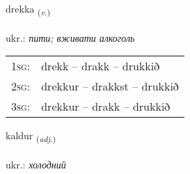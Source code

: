 \documentclass[frontgrid, backgrid]{flacards}\usepackage[]{graphicx}\usepackage[]{xcolor}
\begin{document}
\renewcommand{\blhead}{\vskip5pt {\small\bfseries\footnotesize Sagnorð | дієслово }}
\renewcommand{\bcfoot}{\vskip5pt \hspace{2pt}{\small\bfseries\footnotesize 1K}}


{drekka \small{\textsubscript{(\textit{v.})}} \\[1ex] %
\textphonetic{[trɛhka]} \\
ukr.: \emph{пити; вживати алкоголь} \\  [2ex]
\renewcommand*{\arraystretch}{0.8}
\begin{tabular}{p{1cm}l}
\textsc{1sg}: & drekk -- drakk -- drukkið \\ 
\textsc{2sg}: & drekkur -- drakkst -- drukkið \\ 
\textsc{3sg}: & drekkur -- drakk -- drukkið \\ 
\end{tabular}
}

\renewcommand{\flhead}{\vskip5pt \fboxsep=0pt {\small\bfseries\footnotesize Lýsingarorð | прикметник}}
\renewcommand{\fcfoot}{\vskip5pt \fboxsep=0pt \hspace{2pt}{\small\bfseries\footnotesize 1K}}

\renewcommand{\blhead}{\vskip5pt {\small\bfseries\footnotesize Lýsingarorð | прикметник }}
\renewcommand{\bcfoot}{\vskip5pt \hspace{2pt}{\small\bfseries\footnotesize 1K}}


{kaldur \small{\textsubscript{(\textit{adj.})}} \\[1ex] %
\textphonetic{[kʰaltʏr]} \\
ukr.: \emph{холодний} \\  [2ex]
\renewcommand*{\arraystretch}{0.8}
}
\end{document}
